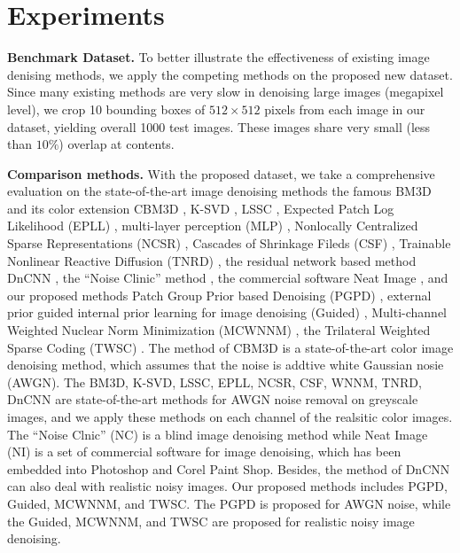 \section{Experiments}

\textbf{Benchmark Dataset.} To better illustrate the effectiveness of existing image denising methods, we apply the competing methods on the proposed new dataset. Since many existing methods are very slow in denoising large images (megapixel level), we crop 10 bounding boxes of $512\times512$ pixels from each image in our dataset, yielding overall 1000 test images. These images share very small (less than $10\%$) overlap at contents.

\textbf{Comparison methods.} With the proposed dataset, we take a comprehensive evaluation on the state-of-the-art image denoising methods the famous BM3D \cite{bm3d} and its color extension CBM3D \cite{cbm3d}, K-SVD \cite{ksvd}, LSSC \cite{lssc}, Expected Patch Log Likelihood (EPLL) \cite{epll}, multi-layer perception (MLP) \cite{mlp}, Nonlocally Centralized Sparse Representations (NCSR) \cite{ncsr}, Cascades of Shrinkage Fileds (CSF) \cite{csf}, Trainable Nonlinear Reactive Diffusion (TNRD) \cite{tnrd}, the residual network based method DnCNN \cite{dncnn}, the ``Noise Clinic'' method \cite{noiseclinic,ncwebsite}, the commercial software Neat Image \cite{neatimage}, and our proposed methods Patch Group Prior based Denoising (PGPD) \cite{pgpd}, external prior guided internal prior learning for image denoising (Guided) \cite{guided}, Multi-channel Weighted Nuclear Norm Minimization (MCWNNM) \cite{mcwnnm}, the Trilateral Weighted Sparse Coding (TWSC) \cite{twsc}. The method of CBM3D is a state-of-the-art color image denoising method, which assumes that the noise is addtive white Gaussian nosie (AWGN). The BM3D, K-SVD, LSSC, EPLL, NCSR, CSF, WNNM, TNRD, DnCNN are state-of-the-art methods for AWGN noise removal on greyscale images, and we apply these methods on each channel of the realsitic color images.  The ``Noise Clnic'' (NC) is a blind image denoising method while Neat Image (NI) is a set of commercial software for image denoising, which has been embedded into Photoshop and Corel Paint Shop. Besides, the method of DnCNN \cite{dncnn} can also deal with realistic noisy images. Our proposed methods includes PGPD, Guided, MCWNNM, and TWSC. The PGPD is proposed for AWGN noise, while the Guided, MCWNNM, and TWSC are proposed for realistic noisy image denoising.

